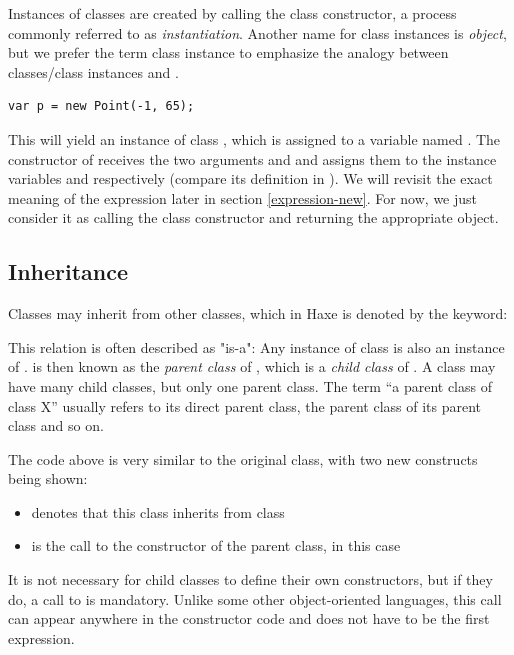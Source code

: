 \documentclass{haxe}
\begin{document}
Instances of classes are created by calling the class constructor, a process commonly referred to as \emph{instantiation}. Another name for class instances is \emph{object}, but we prefer the term class instance to emphasize the analogy between classes/class instances and . 

\begin{lstlisting}
var p = new Point(-1, 65);
\end{lstlisting}
This will yield an instance of class , which is assigned to a variable named . The constructor of  receives the two arguments  and  and assigns them to the instance variables  and  respectively (compare its definition in ). We will revisit the exact meaning of the  expression later in section \ref{expression-new}. For now, we just consider it as calling the class constructor and returning the appropriate object.



\subsection{Inheritance}
\label{types-class-inheritance}

Classes may inherit from other classes, which in Haxe is denoted by the  keyword:

This relation is often described as "is-a": Any instance of class  is also an instance of .  is then known as the \emph{parent class} of , which is a \emph{child class} of . A class may have many child classes, but only one parent class. The term ``a parent class of class X'' usually refers to its direct parent class, the parent class of its parent class and so on.

The code above is very similar to the original  class, with two new constructs being shown:
\begin{itemize}
 \item {} denotes that this class inherits from class 
 \item {} is the call to the constructor of the parent class, in this case 
\end{itemize}
It is not necessary for child classes to define their own constructors, but if they do, a call to  is mandatory. Unlike some other object-oriented languages, this call can appear anywhere in the constructor code and does not have to be the first expression.
\end{document}
